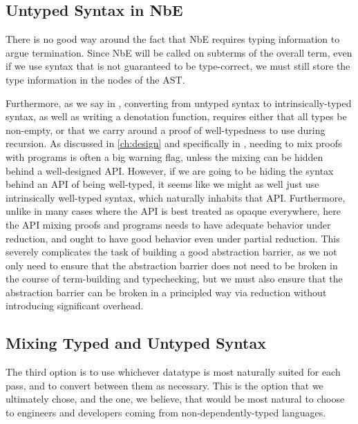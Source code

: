 \subsection{Untyped Syntax in NbE}\label{sec:rewriting-more:AST:untyped-nbe}
There is no good way around the fact that NbE requires typing information to argue termination.
Since NbE will be called on subterms of the overall term, even if we use syntax that is not guaranteed to be type-correct, we must still store the type information in the nodes of the AST.

Furthermore, as we say in , converting from untyped syntax to intrinsically-typed syntax, as well as writing a denotation function, requires either that all types be non-empty, or that we carry around a proof of well-typedness to use during recursion.
As discussed in \autoref{ch:design} and specifically in , needing to mix proofs with programs is often a big warning flag, unless the mixing can be hidden behind a well-designed API.
However, if we are going to be hiding the syntax behind an API of being well-typed, it seems like we might as well just use intrinsically well-typed syntax, which naturally inhabits that API.
Furthermore, unlike in many cases where the API is best treated as opaque everywhere, here the API mixing proofs and programs needs to have adequate behavior under reduction, and ought to have good behavior even under partial reduction.
This severely complicates the task of building a good abstraction barrier, as we not only need to ensure that the abstraction barrier does not need to be broken in the course of term-building and typechecking, but we must also ensure that the abstraction barrier can be broken in a principled way via reduction without introducing significant overhead.


\subsection{Mixing Typed and Untyped Syntax}\label{sec:rewriting-more:AST:both}
The third option is to use whichever datatype is most naturally suited for each pass, and to convert between them as necessary.
This is the option that we ultimately chose, and the one, we believe, that would be most natural to choose to engineers and developers coming from non-dependently-typed languages.

